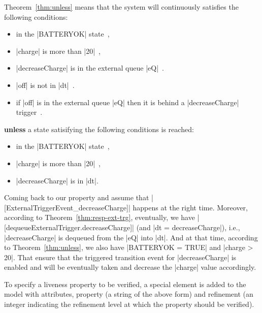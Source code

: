 Theorem~\ref{thm:unless} means that the system will continuously
satisfies the following conditions:
\begin{itemize}
\item in the |BATTERYOK| state~,
  
\item |charge| is more than |20|~,
  
\item |decreaseCharge| is in the external queue |eQ|~.
  
\item |off| is not in |dt|~.
  
\item if |off| is in the external queue |eQ| then it is behind a
  |decreaseCharge| trigger~.
\end{itemize}
\textbf{unless} a state satisifying the following conditions is
reached:
\begin{itemize}
\item in the |BATTERYOK| state~,
  
\item |charge| is more than |20|~,
  
\item |decreaseCharge| is in |dt|.
\end{itemize}

Coming back to our property and assume that
|[ExternalTriggerEvent_decreaseCharge]| happens at the right time.
Moreover, according to Theorem~\ref{thm:resp-ext-trg}, eventually, we
have |[dequeueExternalTrigger.decreaseCharge]| (and %
|dt = {decreaseCharge}|), %
i.e., |decreaseCharge| is dequeued from the |eQ| into |dt|. And at
that time, according to Theorem~\ref{thm:unless}, we also have
|BATTERYOK = TRUE| and |charge > 20|. That ensure that the triggered
transition event for |decreaseCharge| is enabled and will be
eventually taken and decrease the |charge| value accordingly.



To specify a liveness property to be verified, a special \LTL element is added to the \SCXML model with attributes, property (a string of the above form)  and refinement (an integer indicating the refinement level at which the property should be verified).

